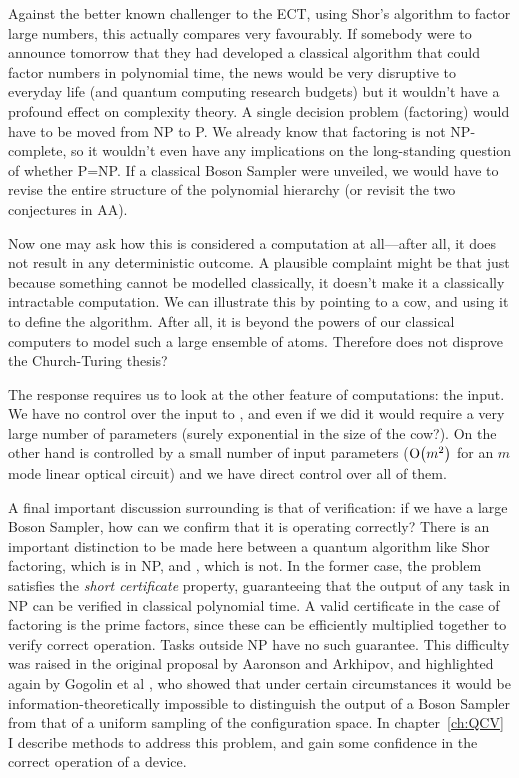Against the better known challenger to the ECT, using Shor's algorithm to factor
large numbers, this actually compares very favourably. If somebody were to
announce tomorrow that they had developed a classical algorithm that could
factor numbers in polynomial time, the news would be very disruptive to
everyday life (and quantum computing research budgets) but it wouldn't have a
profound effect on complexity theory. A single decision problem (factoring)
would have to be moved from NP to P. We already know that factoring is not
NP-complete, so it wouldn't even have any implications on the long-standing
question of whether P=NP. If a classical Boson Sampler were unveiled, we would
have to revise the entire structure of the polynomial hierarchy (or revisit the
two conjectures in AA).

Now one may ask how this is considered a computation at all---after
all, it does not result in any deterministic outcome. A plausible
complaint might be that just because something cannot be modelled classically,
it doesn't make it a classically intractable computation. We can illustrate
this by pointing to a cow, and using it to define the  algorithm.
After all, it is beyond the powers of our classical computers to model such a
large ensemble of atoms. Therefore does  not disprove the
Church-Turing thesis?

The response requires us to look at the other feature of computations: the
input. We have no control over the input to , and even if we did it
would require a very large number of parameters (surely exponential in the size
of the cow?). On the other hand \bosonsampling{} is controlled by a small number
of input parameters (\(\mathrm{O} \!\left(m^{2}\right)\) for an \(m\) mode linear optical
circuit) and we have direct control over all of them.

A final important discussion surrounding \bosonsampling{} is that of
verification: if we have a large Boson Sampler, how can we confirm that it is
operating correctly? There is an important distinction to be made here between
a quantum algorithm like Shor factoring, which is in NP, and \bosonsampling{},
which is not. In the former case, the problem satisfies the \emph{short
certificate} property, guaranteeing that the output of any task in NP can be
verified in classical polynomial time. A valid certificate in the case of
factoring is the prime factors, since these can be efficiently multiplied
together to verify correct operation. Tasks outside NP have no such guarantee.
This difficulty was raised in the original proposal by Aaronson and Arkhipov,
and highlighted again by Gogolin et al \cite{gogolin}, who showed that under
certain circumstances it would be information-theoretically impossible to
distinguish the output of a Boson Sampler from that of a uniform sampling of the
configuration space. In chapter~\ref{ch:QCV} I describe methods to address this
problem, and gain some confidence in the correct operation of a \bosonsampling{}
device.
